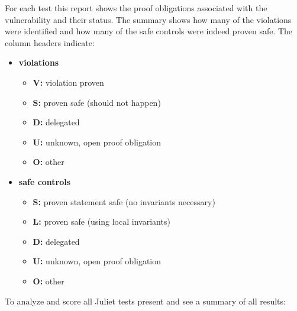 \documentclass[11pt]{article}
\begin{document}
For each test this report shows the proof obligations associated with the
vulnerability and their status. The summary shows how many of the violations
were identified and how many of the safe controls were indeed proven safe.
The column headers indicate:
\begin{itemize}
\item {\bf violations}
  \begin{itemize}
  \item {\bf V:} violation proven
  \item {\bf S:} proven safe (should not happen)
  \item {\bf D:} delegated
  \item {\bf U:} unknown, open proof obligation
  \item {\bf O:} other
  \end{itemize}
\item {\bf safe controls}
  \begin{itemize}
  \item {\bf S:} proven statement safe (no invariants necessary)
  \item {\bf L:} proven safe (using local invariants)
  \item {\bf D:} delegated
  \item {\bf U:} unknown, open proof obligation
  \item {\bf O:} other
  \end{itemize}
\end{itemize}

To analyze and score all Juliet tests present and see a summary of all results:
\end{document}
